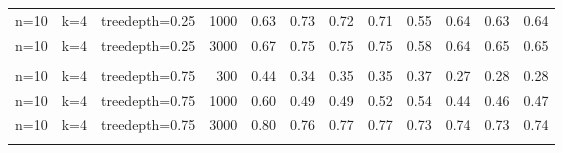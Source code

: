 \begin{table}[ht]
\begin{tabular}{rrrr|cccc|cccc}
  n=10 & k=4 & treedepth=0.25 & 1000 & 0.63 & 0.73 & 0.72 & 0.71 & 0.55 & 0.64 & 0.63 & 0.64 \\ 
  n=10 & k=4 & treedepth=0.25 & 3000 & 0.67 & 0.75 & 0.75 & 0.75 & 0.58 & 0.64 & 0.65 & 0.65 \\ 
   \\ 
n=10 & k=4 & treedepth=0.75 & 300 & 0.44 & 0.34 & 0.35 & 0.35 & 0.37 & 0.27 & 0.28 & 0.28 \\ 
  n=10 & k=4 & treedepth=0.75 & 1000 & 0.60 & 0.49 & 0.49 & 0.52 & 0.54 & 0.44 & 0.46 & 0.47 \\ 
  n=10 & k=4 & treedepth=0.75 & 3000 & 0.80 & 0.76 & 0.77 & 0.77 & 0.73 & 0.74 & 0.73 & 0.74 \\ 
   \bottomrule 
 \multicolumn{12}{l}{\scriptsize } 
 \end{tabular}
\end{table}
